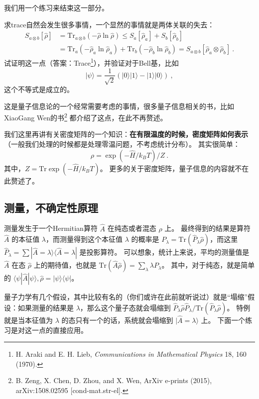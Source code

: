 我们用一个练习来结束这一部分。
\begin{exercise}{}
求trace自然会发生很多事情，一个显然的事情就是两体关联的失去：
\begin{equation}
\begin{split}
S_{a\otimes b}[\hat\rho]&=\text{Tr}_{a\otimes b}(-\hat\rho\ln\hat\rho)\le S_a[\hat\rho_a]+S_b[\hat\rho_b]\\
&=\text{Tr}_a(-\hat\rho_a\ln\hat\rho_a)+\text{Tr}_b(-\hat\rho_b\ln\hat\rho_b)=S_{a\otimes b}[\hat\rho_a\otimes\hat\rho_b]~.
\end{split}
\end{equation}
试证明这一点（答案：Trace\footnote{H. Araki and E. H. Lieb, \textsl{Communications in Mathematical Physics} 18, 160 (1970).}），并验证对于Bell基，比如
\begin{equation}
|\psi\rangle = \frac{1}{\sqrt{2}}(|0\rangle|1\rangle-|1\rangle|0\rangle)~,
\end{equation}
这个不等式是成立的。

这是量子信息论的一个经常需要考虑的事情，很多量子信息相关的书，比如XiaoGang Wen的书\footnote{B. Zeng, X. Chen, D. Zhou, and X. Wen, ArXiv e-prints (2015), arXiv:1508.02595 [cond-mat.str-el].} 都介绍了这点，在此不再赘述。
\end{exercise}

我们这里再讲有关密度矩阵的一个知识：\textbf{在有限温度的时候，密度矩阵如何表示}（一般我们处理的时候都是处理零温问题，不考虑统计分布）。 其实很简单：
\begin{equation}
\rho=\exp(-\hat{H}/k_BT)/Z~.
\end{equation}
其中，$Z=\text{Tr}\exp(-\hat{H}/k_BT)$。 更多的关于密度矩阵，量子信息的内容就不在此赘述了。


\subsection{测量，不确定性原理}

测量发生于一个Hermitian算符 $\hat A$ 在纯态或者混态 $\hat\rho$ 上。 最终得到的结果是算符 $\hat A$ 的本征值 $\lambda$，而测量得到这个本征值 $\lambda$ 的概率是 $P_\lambda=\text{Tr}(\hat{P}_\lambda\hat\rho)$，而这里 $\hat P_\lambda=\sum|\hat{A}=\lambda\rangle\langle\hat{A}=\lambda|$ 是投影算符。 可以想象，统计上来说，平均的测量值是 $\hat A$ 在态 $\hat\rho$ 上的期待值，也就是 $\text{Tr}(\hat A\hat\rho)=\sum_\lambda \lambda P_\lambda$。 其中，对于纯态，就是简单的 $\langle\psi|\hat A|\psi\rangle, \hat\rho=|\psi\rangle\langle\psi|$。

量子力学有几个假设，其中比较有名的（你们或许在此前就听说过）就是``塌缩''假设：如果测量的结果是 $\lambda$，那么这个量子态就会塌缩到 ${\hat P_\lambda\hat\rho\hat P_\lambda}/{\text{Tr}(\hat P_\lambda\hat\rho)}$。 特例就是当本征值为 $\lambda$ 的态只有一个的话，系统就会塌缩到 $|\hat{A}=\lambda\rangle$ 上。 下面一个练习是对这一点的直接应用。

